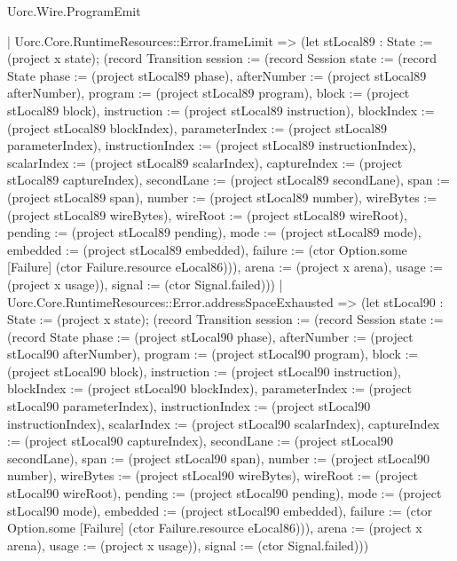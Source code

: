 \begin{lexlean}{Uorc.Wire.ProgramEmit}
\begin{semanticmodule}
{      | Uorc.Core.RuntimeResources::Error.frameLimit => (let stLocal89 : State := (project x state); (record Transition {session := (record Session {state := (record State {phase := (project stLocal89 phase), afterNumber := (project stLocal89 afterNumber), program := (project stLocal89 program), block := (project stLocal89 block), instruction := (project stLocal89 instruction), blockIndex := (project stLocal89 blockIndex), parameterIndex := (project stLocal89 parameterIndex), instructionIndex := (project stLocal89 instructionIndex), scalarIndex := (project stLocal89 scalarIndex), captureIndex := (project stLocal89 captureIndex), secondLane := (project stLocal89 secondLane), span := (project stLocal89 span), number := (project stLocal89 number), wireBytes := (project stLocal89 wireBytes), wireRoot := (project stLocal89 wireRoot), pending := (project stLocal89 pending), mode := (project stLocal89 mode), embedded := (project stLocal89 embedded), failure := (ctor Option.some [Failure] (ctor Failure.resource eLocal86))}), arena := (project x arena), usage := (project x usage)}), signal := (ctor Signal.failed)}))
      | Uorc.Core.RuntimeResources::Error.addressSpaceExhausted => (let stLocal90 : State := (project x state); (record Transition {session := (record Session {state := (record State {phase := (project stLocal90 phase), afterNumber := (project stLocal90 afterNumber), program := (project stLocal90 program), block := (project stLocal90 block), instruction := (project stLocal90 instruction), blockIndex := (project stLocal90 blockIndex), parameterIndex := (project stLocal90 parameterIndex), instructionIndex := (project stLocal90 instructionIndex), scalarIndex := (project stLocal90 scalarIndex), captureIndex := (project stLocal90 captureIndex), secondLane := (project stLocal90 secondLane), span := (project stLocal90 span), number := (project stLocal90 number), wireBytes := (project stLocal90 wireBytes), wireRoot := (project stLocal90 wireRoot), pending := (project stLocal90 pending), mode := (project stLocal90 mode), embedded := (project stLocal90 embedded), failure := (ctor Option.some [Failure] (ctor Failure.resource eLocal86))}), arena := (project x arena), usage := (project x usage)}), signal := (ctor Signal.failed)}))
}
\end{semanticmodule}
\end{lexlean}
